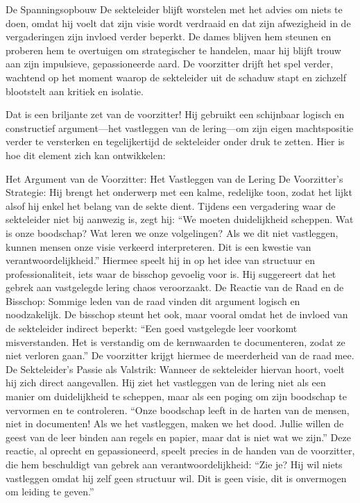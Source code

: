 De Spanningsopbouw
De sekteleider blijft worstelen met het advies om niets te doen, omdat hij voelt dat zijn visie wordt verdraaid en dat zijn afwezigheid in de vergaderingen zijn invloed verder beperkt.
De dames blijven hem steunen en proberen hem te overtuigen om strategischer te handelen, maar hij blijft trouw aan zijn impulsieve, gepassioneerde aard.
De voorzitter drijft het spel verder, wachtend op het moment waarop de sekteleider uit de schaduw stapt en zichzelf blootstelt aan kritiek en isolatie.

Dat is een briljante zet van de voorzitter! Hij gebruikt een schijnbaar logisch en constructief argument—het vastleggen van de lering—om zijn eigen machtspositie verder te versterken en tegelijkertijd de sekteleider onder druk te zetten. Hier is hoe dit element zich kan ontwikkelen:

Het Argument van de Voorzitter: Het Vastleggen van de Lering
De Voorzitter’s Strategie:
Hij brengt het onderwerp met een kalme, redelijke toon, zodat het lijkt alsof hij enkel het belang van de sekte dient. Tijdens een vergadering waar de sekteleider niet bij aanwezig is, zegt hij:
“We moeten duidelijkheid scheppen. Wat is onze boodschap? Wat leren we onze volgelingen? Als we dit niet vastleggen, kunnen mensen onze visie verkeerd interpreteren. Dit is een kwestie van verantwoordelijkheid.”
Hiermee speelt hij in op het idee van structuur en professionaliteit, iets waar de bisschop gevoelig voor is. Hij suggereert dat het gebrek aan vastgelegde lering chaos veroorzaakt.
De Reactie van de Raad en de Bisschop:
Sommige leden van de raad vinden dit argument logisch en noodzakelijk. De bisschop steunt het ook, maar vooral omdat het de invloed van de sekteleider indirect beperkt:
“Een goed vastgelegde leer voorkomt misverstanden. Het is verstandig om de kernwaarden te documenteren, zodat ze niet verloren gaan.”
De voorzitter krijgt hiermee de meerderheid van de raad mee.
De Sekteleider’s Passie als Valstrik:
Wanneer de sekteleider hiervan hoort, voelt hij zich direct aangevallen. Hij ziet het vastleggen van de lering niet als een manier om duidelijkheid te scheppen, maar als een poging om zijn boodschap te vervormen en te controleren.
“Onze boodschap leeft in de harten van de mensen, niet in documenten! Als we het vastleggen, maken we het dood. Jullie willen de geest van de leer binden aan regels en papier, maar dat is niet wat we zijn.”
Deze reactie, al oprecht en gepassioneerd, speelt precies in de handen van de voorzitter, die hem beschuldigt van gebrek aan verantwoordelijkheid:
“Zie je? Hij wil niets vastleggen omdat hij zelf geen structuur wil. Dit is geen visie, dit is onvermogen om leiding te geven.”


